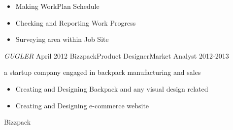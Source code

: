 \begin{experiences}
{                      \begin{itemize}
                        \item Making WorkPlan Schedule                               
                        \item Checking and Reporting Work Progress           
                        \item Surveying area within Job Site                       
                      \end{itemize}
                    }
                    {\emph{GUGLER}}
  \emptySeparator
  \experience
  {April 2012}  {Bizzpack}{Product Designer}{Market Analyst}
  {2012-2013}   {
                      a startup company engaged in backpack manufacturing and sales  
                      \begin{itemize}
                        \item Creating and Designing Backpack and any visual design related                                            
                        \item Creating and Designing e-commerce website   
                      \end{itemize}
                  }
                  {Bizzpack}  
\end{experiences}
